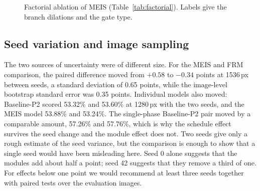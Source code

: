 \documentclass[preprint,12pt]{elsarticle}
\begin{document}
\begin{figure}[t]
\centering
{}
\caption{Factorial ablation of MEIS (Table~\ref{tab:factorial}). Labels give the
branch dilations and the gate type.}
\label{fig:factorial}
\end{figure}

\subsection{Seed variation and image sampling}
\label{sec:res-variance}

The two sources of uncertainty were of different size. For the MEIS and FRM
comparison, the paired difference moved from $+0.58$ to $-0.34$ points at
1536\,px between seeds, a standard deviation of 0.65 points, while the image-level
bootstrap standard error was 0.35 points. Individual models also moved: Baseline-P2
scored 53.32\% and 53.60\% at 1280\,px with the two seeds, and the MEIS model
53.88\% and 53.24\%. The single-phase Baseline-P2 pair moved by a comparable
amount, 57.26\% and 57.76\%, which is why the schedule effect survives the seed
change and the module effect does not.
Two seeds give only a rough estimate of the seed variance, but
the comparison is enough to show that a single seed would have been misleading
here. Seed 0 alone suggests that the modules add about half a point; seed 42
suggests that they remove a third of one. For effects below one point we would
recommend at least three seeds together with paired tests over the evaluation
images.
\end{document}
